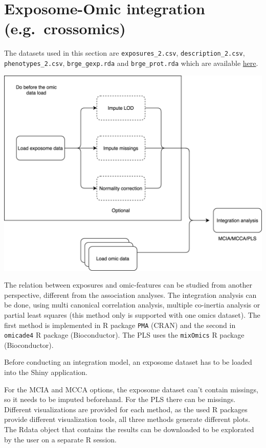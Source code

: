 \documentclass[
]{book}
\begin{document}
\hypertarget{exposome-omic-integration-e.g.-crossomics}{%
\section{Exposome-Omic integration (e.g.~crossomics)}\label{exposome-omic-integration-e.g.-crossomics}}

The datasets used in this section are \texttt{exposures\_2.csv}, \texttt{description\_2.csv}, \texttt{phenotypes\_2.csv}, \texttt{brge\_gexp.rda} and \texttt{brge\_prot.rda} which are available \href{https://github.com/isglobal-brge/exposomeShiny/tree/master/data}{here}.

\includegraphics{images/analysis12.png}

The relation between exposures and omic-features can be studied from another perspective, different from the association analyses. The integration analysis can be done, using multi canonical correlation analysis, multiple co-inertia analysis or partial least squares (this method only is supported with one omics dataset). The first method is implemented in R package \texttt{PMA} (CRAN) and the second in \texttt{omicade4} R package (Bioconductor). The PLS uses the \texttt{mixOmics} R package (Bioconductor).

Before conducting an integration model, an exposome dataset has to be loaded into the Shiny application.

For the MCIA and MCCA options, the exposome dataset can't contain missings, so it needs to be imputed beforehand. For the PLS there can be missings. Different visualizations are provided for each method, as the used R packages provide different visualization tools, all three methods generate different plots. The Rdata object that contains the results can be downloaded to be explorated by the user on a separate R session.
\end{document}
